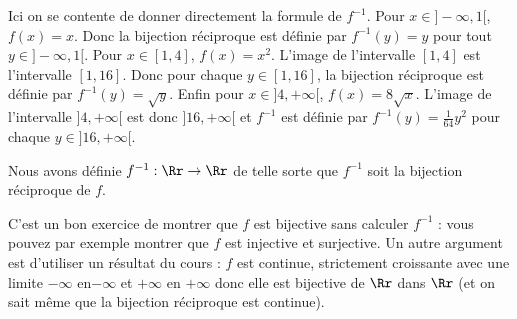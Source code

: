 {\begin{enumerate}
{Ici on se contente de donner directement la formule de $f^{-1}$. 
Pour $x \in  ]-\infty,1[$, $f(x)=x$. Donc la bijection réciproque est définie par $f^{-1}(y)=y$ pour tout $y \in  ]-\infty,1[$.
Pour $x \in [1,4]$, $f(x)=x^2$. L'image de l'intervalle $[1,4]$ est l'intervalle $[1,16]$. Donc pour chaque $y \in [1,16]$,
la bijection réciproque est définie par $f^{-1}(y) = \sqrt y$. 
Enfin pour $x\in]4,+\infty[$, $f(x) = 8\sqrt x$. L'image de l'intervalle $]4,+\infty[$ est donc $]16,+\infty[$
et $f^{-1}$ est définie par $f^{-1}(y) = \frac{1}{64} y^2$ pour chaque $y \in ]16,+\infty[$.

Nous avons définie $f^{-1} : \Rr \to \Rr$ de telle sorte que $f^{-1}$ soit la bijection réciproque de $f$.

\bigskip

C'est un bon exercice de montrer que $f$ est bijective sans calculer $f^{-1}$ :
vous pouvez par exemple montrer que $f$ est injective et surjective.
Un autre argument est d'utiliser un résultat du cours : $f$ est continue, strictement croissante avec une limite $-\infty$ en$-\infty$
et $+\infty$ en $+\infty$ donc elle est bijective de $\Rr$ dans $\Rr$ (et on sait même que la bijection réciproque est continue).}
\end{enumerate}
}

